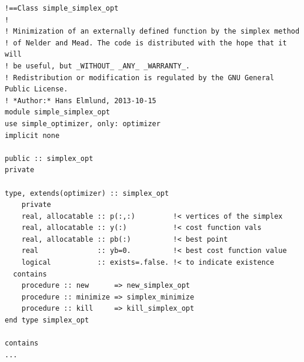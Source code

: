 \documentclass[a4paper,11pt]{article}
\begin{document}
\begin{verbatim}
!==Class simple_simplex_opt
!
! Minimization of an externally defined function by the simplex method 
! of Nelder and Mead. The code is distributed with the hope that it will 
! be useful, but _WITHOUT_ _ANY_ _WARRANTY_. 
! Redistribution or modification is regulated by the GNU General Public License. 
! *Author:* Hans Elmlund, 2013-10-15
module simple_simplex_opt
use simple_optimizer, only: optimizer
implicit none

public :: simplex_opt
private

type, extends(optimizer) :: simplex_opt
    private
    real, allocatable :: p(:,:)         !< vertices of the simplex
    real, allocatable :: y(:)           !< cost function vals
    real, allocatable :: pb(:)          !< best point
    real              :: yb=0.          !< best cost function value
    logical           :: exists=.false. !< to indicate existence
  contains
    procedure :: new      => new_simplex_opt
    procedure :: minimize => simplex_minimize
    procedure :: kill     => kill_simplex_opt
end type simplex_opt

contains
...
\end{verbatim}
\end{document}
